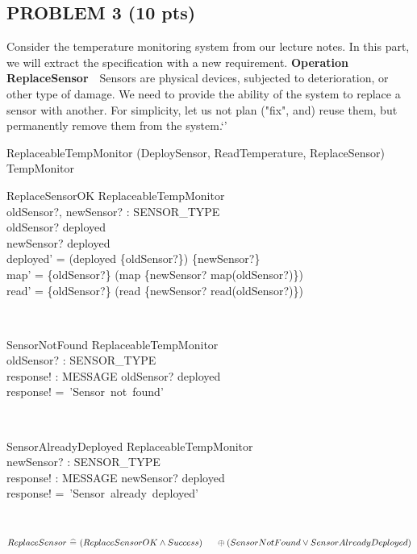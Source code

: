 \documentclass[12pt]{article}
\begin{document}
\begin{spacing}{1.5}
    \section*{PROBLEM 3 (10 pts)}

    Consider the temperature monitoring system from our lecture notes. In this part, we will extract the specification with a new requirement.
    \newline \newline
    \textbf{Operation ReplaceSensor}~~Sensors are physical devices, subjected to deterioration, or other type of damage. We need to provide the ability of the system to replace a sensor with another. For simplicity, let us not plan ("fix", and) reuse them, but permanently remove them from the system.`'

    \begin{class}{ReplaceableTempMonitor}
        \sres (DeploySensor, ReadTemperature, ReplaceSensor) \\
        TempMonitor \\
        \begin{schema}{ReplaceSensorOK}
            \Delta ReplaceableTempMonitor \\
            oldSensor?, newSensor? : SENSOR\_TYPE \\
            \where
            oldSensor? \in deployed \\
            newSensor? \notin deployed \\
            deployed' = (deployed \setminus \{oldSensor?\}) \cup \{newSensor?\} \\
            map' = \{oldSensor?\} \dsub (map \cup \{newSensor? \mapsto map(oldSensor?)\}) \\
            read' = \{oldSensor?\} \dsub (read \cup \{newSensor? \mapsto read(oldSensor?)\})
        \end{schema} \\
        \begin{schema}{SensorNotFound}
            \Xi ReplaceableTempMonitor \\
            oldSensor? : SENSOR\_TYPE \\
            response! : MESSAGE
            \where
            oldSensor? \notin deployed \\
            response! =~'Sensor~not~found'
        \end{schema} \\
        \begin{schema}{SensorAlreadyDeployed}
            \Xi ReplaceableTempMonitor \\
            newSensor? : SENSOR\_TYPE \\
            response! : MESSAGE
            \where
            newSensor? \in deployed \\
            response! =~'Sensor~already~deployed'
        \end{schema} \\
        $$ReplaceSensor ~\widehat{=} \, \,              (ReplaceSensorOK \land Success) \\ \indent \oplus (SensorNotFound \lor SensorAlreadyDeployed)$$
    \end{class}
\end{spacing}
\end{document}
